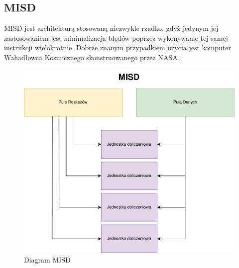 \documentclass[a4paper,12pt]{book} %
\begin{document}
\subsection {MISD}
MISD jest architekturą stosowaną niezwykle rzadko, gdyż jedynym jej zastosowaniem jest minimalizacja błędów poprzez wykonywanie tej samej instrukcji wielokrotnie. Dobrze znanym przypadkiem użycia jest komputer Wahadłowca Kosmicznego skonstruowanego przez NASA \cite{SpaceShuttle}.
\begin{figure}[h]
	\centering
	\includegraphics[scale=0.7]{assets/MISD.pdf}
	\caption{Diagram MISD}
	\label{MISD}
\end{figure}
\end{document}

